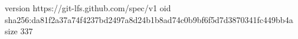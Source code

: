 version https://git-lfs.github.com/spec/v1
oid sha256:da81f2a37a74f4237bd2497a8d24b1b8ad74c0b9bf6f5d7d3870341fc449bb4a
size 337
